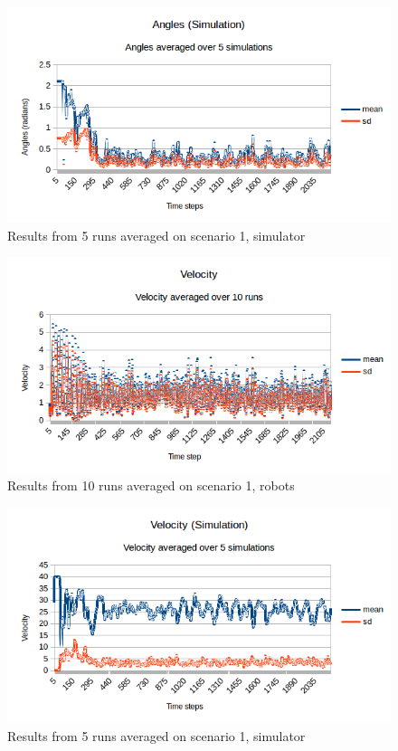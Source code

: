 \begin{figure}[h]
\begin{center}
\includegraphics[width=0.8\linewidth]{figs/runs/1sangle}
\end{center}
\caption[1. Angle, Simulation]{Results from 5 runs averaged on scenario 1, simulator}
\label{fig:res1sang}
\end{figure}
\begin{figure}[h]
\begin{center}
\includegraphics[width=0.8\linewidth]{figs/runs/1pvel}
\end{center}
\caption[1. Velocity, robots]{Results from 10 runs averaged on scenario 1, robots}
\label{fig:res1pvel}
\end{figure}
\begin{figure}[h]
\begin{center}
\includegraphics[width=0.8\linewidth]{figs/runs/1svel}
\end{center}
\caption[1. Velocity, simulation]{Results from 5 runs averaged on scenario 1, simulator}
\label{fig:res1svel}
\end{figure}
\clearpage
